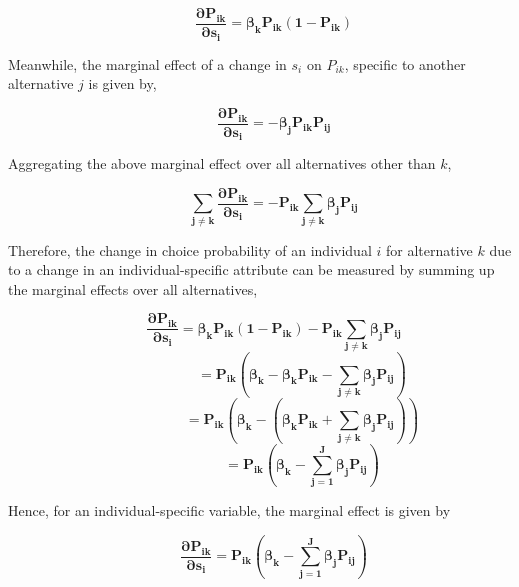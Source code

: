 \documentclass[a4paper,11pt]{article}
\begin{document}
        \begin{equation*}
            \qquad \mathbf{\dfrac{\partial P_{ik}}{\partial s_{i}} = \beta_{k}P_{ik}\left(1-P_{ik}\right)} 
        \end{equation*}

        Meanwhile, the marginal effect of a change in $s_{i}$ on $P_{ik}$, specific to another alternative $j$ is given by,

        \begin{equation*}
            \qquad \mathbf{\dfrac{\partial P_{ik}}{\partial s_{i}} = - \beta_{j}P_{ik}P_{ij}}
        \end{equation*}

    Aggregating the above marginal effect over all alternatives other than $k$,

        \begin{equation*}
            \qquad \mathbf{\sum_{j \neq k}\dfrac{\partial P_{ik}}{\partial s_{i}} = - P_{ik} \sum_{j \neq k}\beta_{j}P_{ij}}
        \end{equation*}

    Therefore, the change in choice probability of an individual $i$ for alternative $k$ due to a change in an individual-specific attribute can be measured by summing up the marginal effects over all alternatives, 

        \begin{equation*}
            \qquad \mathbf{\dfrac{\partial P_{ik}}{\partial s_{i}} = \beta_{k}P_{ik}\left(1-P_{ik}\right) - P_{ik} \sum_{j \neq k}\beta_{j}P_{ij}}
        \end{equation*}
        \begin{equation*}
            \qquad \qquad \qquad \mathbf{ = P_{ik} \left(\beta_{k} - \beta_{k}P_{ik} - \sum_{j \neq k}\beta_{j}P_{ij}\right)}
        \end{equation*}
        \begin{equation*}
            \qquad \qquad \qquad \mathbf{ = P_{ik} \left(\beta_{k} - \left(\beta_{k}P_{ik} + \sum_{j \neq k}\beta_{j}P_{ij}\right)\right)}
        \end{equation*}
        \begin{equation*}
            \qquad \qquad \qquad \mathbf{ = P_{ik} \left(\beta_{k} - \sum_{j = 1}^{J} \beta_{j}P_{ij}\right)}
        \end{equation*}

    Hence, for an individual-specific variable, the marginal effect is given by 

        \begin{equation*}
            \qquad \mathbf{\dfrac{\partial P_{ik}}{\partial s_{i}} = P_{ik} \left(\beta_{k} - \sum_{j = 1}^{J} \beta_{j}P_{ij}\right)}
        \end{equation*}
\end{document}
